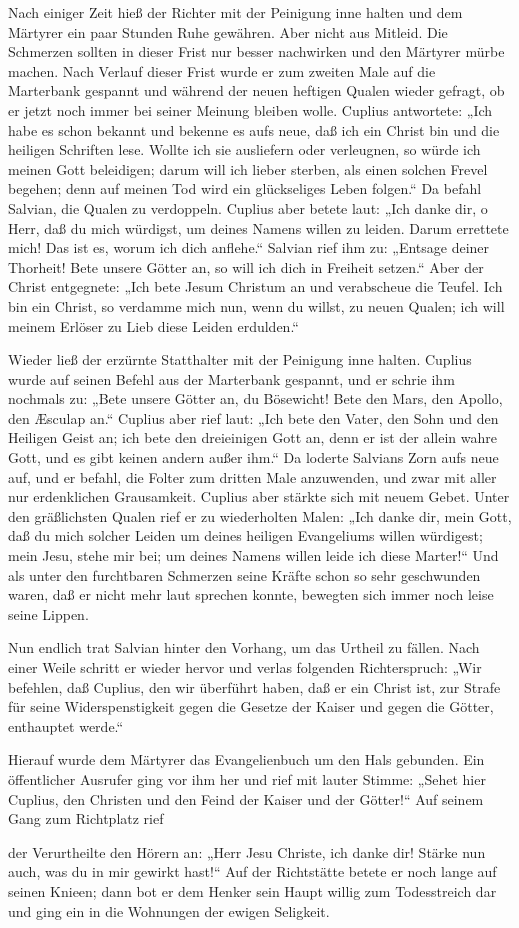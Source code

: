 Nach einiger Zeit hieß der Richter mit der Peinigung inne halten und dem Märtyrer ein paar Stunden Ruhe gewähren. Aber nicht aus Mitleid. Die Schmerzen sollten in dieser Frist nur besser nachwirken und den Märtyrer mürbe machen. Nach Verlauf dieser Frist wurde er zum zweiten Male auf die Marterbank gespannt und während der neuen heftigen Qualen wieder gefragt, ob er jetzt noch immer bei seiner Meinung bleiben wolle. Cuplius antwortete: „Ich habe es schon bekannt und bekenne es aufs neue, daß ich ein Christ bin und die heiligen Schriften lese. Wollte ich sie ausliefern oder verleugnen, so würde ich meinen Gott beleidigen; darum will ich lieber sterben, als einen solchen Frevel begehen; denn auf meinen Tod wird ein glückseliges Leben folgen.“ Da befahl Salvian, die Qualen zu verdoppeln. Cuplius aber betete laut: „Ich danke dir, o Herr, daß du mich würdigst, um deines Namens willen zu leiden. Darum errettete mich! Das ist es, worum ich dich anflehe.“ Salvian rief ihm zu: „Entsage deiner Thorheit! Bete unsere Götter an, so will ich dich in Freiheit setzen.“ Aber der Christ entgegnete: „Ich bete Jesum Christum an und verabscheue die Teufel. Ich bin ein Christ, so verdamme mich nun, wenn du willst, zu neuen Qualen; ich will meinem Erlöser zu Lieb diese Leiden erdulden.“

Wieder ließ der erzürnte Statthalter mit der Peinigung inne halten. Cuplius wurde auf seinen Befehl aus der Marterbank gespannt, und er schrie ihm nochmals zu: „Bete unsere Götter an, du Bösewicht! Bete den Mars, den Apollo, den Æsculap an.“ Cuplius aber rief laut: „Ich bete den Vater, den Sohn und den Heiligen Geist an; ich bete den dreieinigen Gott an, denn er ist der allein wahre Gott, und es gibt keinen andern außer ihm.“ Da loderte Salvians Zorn aufs neue auf, und er befahl, die Folter zum dritten Male anzuwenden, und zwar mit aller nur erdenklichen Grausamkeit. Cuplius aber stärkte sich mit neuem Gebet. Unter den gräßlichsten Qualen rief er zu wiederholten Malen: „Ich danke dir, mein Gott, daß du mich solcher Leiden um deines heiligen Evangeliums willen würdigest; mein Jesu, stehe mir bei; um deines Namens willen leide ich diese Marter!“ Und als unter den furchtbaren Schmerzen seine Kräfte schon so sehr geschwunden waren, daß er nicht mehr laut sprechen konnte, bewegten sich immer noch leise seine Lippen.

Nun endlich trat Salvian hinter den Vorhang, um das Urtheil zu fällen. Nach einer Weile schritt er wieder hervor und verlas folgenden Richterspruch: „Wir befehlen, daß Cuplius, den wir überführt haben, daß er ein Christ ist, zur Strafe für seine Widerspenstigkeit gegen die Gesetze der Kaiser und gegen die Götter, enthauptet werde.“

Hierauf wurde dem Märtyrer das Evangelienbuch um den Hals gebunden. Ein öffentlicher Ausrufer ging vor ihm her und rief mit lauter Stimme: „Sehet hier Cuplius, den Christen und den Feind der Kaiser und der Götter!“ Auf seinem Gang zum Richtplatz rief

der Verurtheilte den Hörern an: „Herr Jesu Christe, ich danke dir! Stärke nun auch, was du in mir gewirkt hast!“ Auf der Richtstätte betete er noch lange auf seinen Knieen; dann bot er dem Henker sein Haupt willig zum Todesstreich dar und ging ein in die Wohnungen der ewigen Seligkeit.
